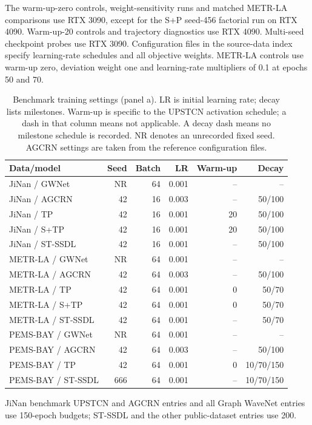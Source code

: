 \documentclass[a4paper,10pt]{article}
\begin{document}
The warm-up-zero controls, weight-sensitivity runs and matched METR-LA comparisons use RTX 3090, except for the S+P seed-456 factorial run on RTX 4090. Warm-up-20 controls and trajectory diagnostics use RTX 4090. Multi-seed checkpoint probes use RTX 3090. Configuration files in the source-data index specify learning-rate schedules and all objective weights. METR-LA controls use warm-up zero, deviation weight one and learning-rate multipliers of 0.1 at epochs 50 and 70.

\begin{table}[htbp]
\centering
\scriptsize
\renewcommand{\arraystretch}{1.06}
\setlength{\tabcolsep}{2pt}
\caption{Benchmark training settings (panel a). LR is initial learning rate; decay lists milestones. Warm-up is specific to the UPSTCN activation schedule; a dash in that column means not applicable. A decay dash means no milestone schedule is recorded. NR denotes an unrecorded fixed seed. AGCRN settings are taken from the reference configuration files.}\label{tab:protocol}
\begin{tabular*}{\textwidth}{@{\extracolsep{\fill}}lrrrrr@{}}
\toprule
Data/model & Seed & Batch & LR & Warm-up & Decay \\
\midrule
JiNan / GWNet & NR & 64 & 0.001 & -- & -- \\
JiNan / AGCRN & 42 & 16 & 0.003 & -- & 50/100 \\
JiNan / TP & 42 & 16 & 0.001 & 20 & 50/100 \\
JiNan / S+TP & 42 & 16 & 0.001 & 20 & 50/100 \\
JiNan / ST-SSDL & 42 & 16 & 0.001 & -- & 50/100 \\
METR-LA / GWNet & NR & 64 & 0.001 & -- & -- \\
METR-LA / AGCRN & 42 & 64 & 0.003 & -- & 50/100 \\
METR-LA / TP & 42 & 64 & 0.001 & 0 & 50/70 \\
METR-LA / S+TP & 42 & 64 & 0.001 & 0 & 50/70 \\
METR-LA / ST-SSDL & 42 & 64 & 0.001 & -- & 50/70 \\
PEMS-BAY / GWNet & NR & 64 & 0.001 & -- & -- \\
PEMS-BAY / AGCRN & 42 & 64 & 0.003 & -- & 50/100 \\
PEMS-BAY / TP & 42 & 64 & 0.001 & 0 & 10/70/150 \\
PEMS-BAY / ST-SSDL & 666 & 64 & 0.001 & -- & 10/70/150 \\
\bottomrule
\end{tabular*}
JiNan benchmark UPSTCN and AGCRN entries and all Graph WaveNet entries use 150-epoch budgets; ST-SSDL and the other public-dataset entries use 200.


\end{table}
\end{document}
